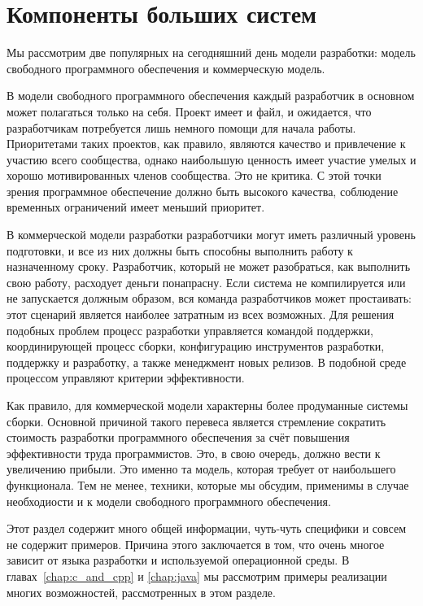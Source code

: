 \section{Компоненты больших систем}

Мы рассмотрим две популярных на сегодняшний день модели разработки:
модель свободного программного обеспечения и коммерческую модель.

В модели свободного программного обеспечения каждый разработчик в
основном может полагаться только на себя. Проект имеет \Makefile{} и
 файл, и ожидается, что разработчикам потребуется
лишь немного помощи для начала работы. Приоритетами таких проектов, как
правило, являются качество и привлечение к участию всего сообщества,
однако наибольшую ценность имеет участие умелых и хорошо
мотивированных членов сообщества. Это не критика. С этой точки
зрения программное обеспечение должно быть высокого качества,
соблюдение временных ограничений имеет меньший приоритет.

В коммерческой модели разработки разработчики могут иметь различный
уровень подготовки, и все из них должны быть способны выполнить работу
к назначенному сроку. Разработчик, который не может разобраться, как
выполнить свою работу, расходует деньги понапрасну. Если система не
компилируется или не запускается должным образом, вся команда
разработчиков может простаивать: этот сценарий является наиболее
затратным из всех возможных. Для решения подобных проблем процесс
разработки управляется командой поддержки, координирующей процесс
сборки, конфигурацию инструментов разработки, поддержку и разработку,
а также менеджмент новых релизов. В подобной среде процессом управляют 
критерии эффективности.

Как правило, для коммерческой модели характерны более продуманные
системы сборки. Основной причиной такого перевеса является стремление
сократить стоимость разработки программного обеспечения за счёт
повышения эффективности труда программистов. Это, в свою очередь,
должно вести к увеличению прибыли. Это именно та модель, которая
требует от \GNUmake{} наибольшего функционала. Тем не менее, техники,
которые мы обсудим, применимы в случае необходиости и к модели
свободного программного обеспечения.

Этот раздел содержит много общей информации, чуть-чуть специфики
и совсем не содержит примеров. Причина этого заключается в том, что
очень многое зависит от языка разработки и используемой операционной
среды. В главах~\ref{chap:c_and_cpp} и \ref{chap:java} мы рассмотрим
примеры реализации многих возможностей, рассмотренных в этом разделе.

